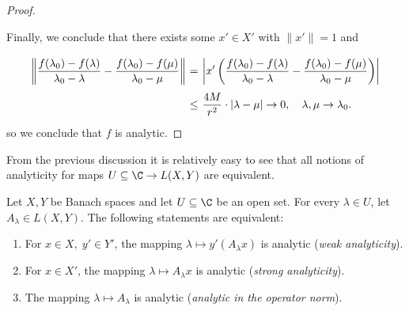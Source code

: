 \begin{proof}
\begin{lemma}
    \end{lemma}
    Finally, we conclude that there exists some $x' \in X'$ with $\|x'\| = 1$ and
    \[ \everymath{\displaystyle}
    \arraycolsep=1.8pt\def\arraystretch{2.5}
    \begin{array}{rcl}
        \left\|  \frac{f(\lambda_0)-f(\lambda)}{\lambda_0 - \lambda} - \frac{f(\lambda_0)-f(\mu)}{\lambda_0 - \mu} \right\| & = & \left| x'\left(  \frac{f(\lambda_0)-f(\lambda)}{\lambda_0 - \lambda} - \frac{f(\lambda_0)-f(\mu)}{\lambda_0 - \mu} \right) \right| \\
        & \leq &  \frac{4M}{r^2} \cdot |\lambda-\mu| \to 0,\quad \lambda,\mu \to \lambda_0.
    \end{array}\]
    so we conclude that $f$ is analytic.
\end{proof}

From the previous discussion it is relatively easy to see that all notions of analyticity for maps $U\subseteq \C \to L(X,Y)$ are equivalent.

\begin{corollary}\label{cor:analytic_equivalences}
    Let $X, Y$ be Banach spaces and let $U \subseteq \C$ be an open set. For every $\lambda \in U$, let $A_\lambda \in L(X,Y)$. The following statements are equivalent:
    \begin{enumerate}[label=(\alph*)]
        \item For $x\in X,\; y'\in Y'$, the mapping $\lambda \mapsto y'(A_\lambda x)$ is analytic (\textit{weak analyticity}).
        \item For $x\in X'$, the mapping $\lambda \mapsto A_\lambda x$ is analytic (\textit{strong analyticity}).
        \item The mapping $\lambda \mapsto A_\lambda$ is analytic (\textit{analytic in the operator norm}).
    \end{enumerate}
\end{corollary}

